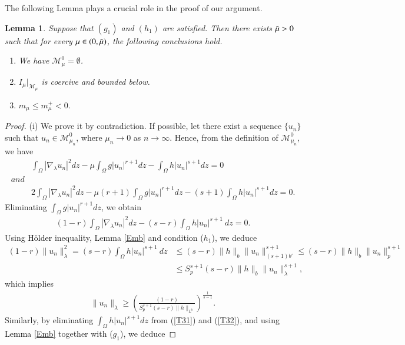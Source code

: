 \documentclass[12pt, notitlepage]{article}
\newtheorem{lem}[theorem]{Lemma}
\begin{document}
{The following Lemma plays a crucial role in the proof of our argument.

\begin{lem}\label{CL}
      Suppose that $(g_1)$ and $(h_1)$ are satisfied. Then there exists $\Tilde{\mu}>0$ such that for every $\mu\in(0,\Tilde{\mu})$, the following conclusions hold.
      \begin{enumerate}
          \item[(i)]  We have $\mathscr{M}^0_\mu=\emptyset$.
          \item[(ii)] $I_\mu|_{\mathscr{M}_\mu}$ is coercive and bounded below.
          \item[(iii)] $m_\mu\leq m^+_\mu<0.$
      \end{enumerate}
  \end{lem}  
\begin{proof}
    (i) We prove it by contradiction. If possible, let there exist a sequence $\{u_n\}$ such that $u_n\in \mathscr{M}^0_{\mu_n}$, where $\mu_n\to 0$ as $n\to\infty$. Hence, from the definition of $\mathscr{M}^0_{\mu_n}$, we have 
    \begin{align}
        &\int_\Omega |\nabla_\lambda u_n|^2 dz-\mu\int_\Omega g|u_n|^{r+1} dz-\int_\Omega h|u_n|^{s+1} dz=0\label{T31}\\
        and&\nonumber\\
        &2\int_\Omega |\nabla_\lambda u_n|^2 dz-\mu(r+1)\int_\Omega g|u_n|^{r+1} dz-(s+1)\int_\Omega h|u_n|^{s+1} dz=0.\label{T32}
    \end{align}
Eliminating $\int_\Omega g|u_n|^{r+1} dz$, we obtain
\begin{align*}
    (1-r)\int_\Omega |\nabla_\lambda u_n|^2 dz-(s-r)\int_\Omega h|u_n|^{s+1}\ dz=0.
\end{align*}
 Using \textcolor{black}{H\"{o}lder} inequality, Lemma \ref{Emb} and condition ($h_1$), we deduce
\begin{align*}
    (1-r)\|u_n\|_\lambda^2=(s-r)\int_\Omega h|u_n|^{s+1}\ dz&\leq (s-r)\|h\|_b\|u_n\|_{(s+1)b'}^{s+1}\leq (s-r)\|h\|_b\|u_n\|_{p}^{s+1}\\
    &\leq S_p^{s+1}(s-r)\|h\|_{b}\|u_n\|_\lambda^{s+1},
\end{align*}
which implies
 \begin{align}\label{T41}
     \|u_n\|_\lambda\geq \left (\frac{(1-r)}{S_p^{s+1}(s-r)\|h\|_{L^b}}\right )^\frac{1}{s-1}.
 \end{align}
Similarly, by eliminating $\int_\Omega h|u_n|^{s+1} dz$ from (\ref{T31}) and (\ref{T32}), and using \textcolor{black}{Lemma \ref{Emb}} together with ($g_1$), we deduce

\end{proof}}
\end{document}
